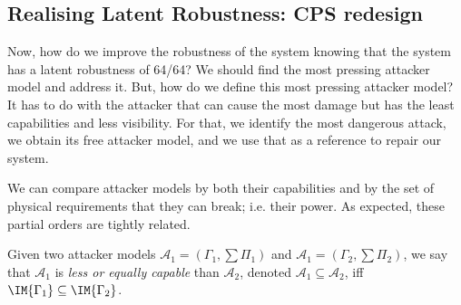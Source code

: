 {\subsection{Realising Latent Robustness: CPS redesign}
Now, how do we improve the robustness of the system knowing that the system has a latent robustness of 64/64? We should find the most pressing attacker model and address it. But, how do we define this most pressing attacker model? It has to do with the attacker that can cause the most damage but has the least capabilities and less visibility. For that, we identify the most dangerous attack, we obtain its free attacker model, and we use that as a reference to repair our system.

We can compare attacker models by both their capabilities and by the set of physical requirements that they can break; i.e. their power. As expected, these partial orders are tightly related.
\begin{definition}
  Given two attacker models $\mathcal{A}_1=(\Gamma_1,\sum \Pi_1)$ and $\mathcal{A}_1=(\Gamma_2,\sum \Pi_2)$, we say that $\mathcal{A}_1$ is \emph{less or equally capable} than $\mathcal{A}_2$, denoted $\mathcal{A}_1\subseteq \mathcal{A}_2$, iff $\IM{\Gamma_1}\subseteq \IM{\Gamma_2}$. 
  


\end{definition}}
